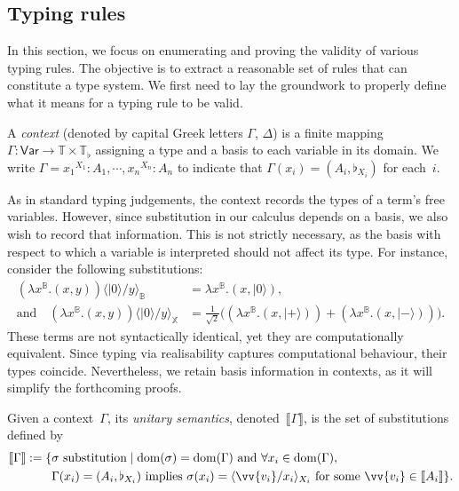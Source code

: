 \documentclass[runningheads,orivec,envcountsame,envcountsect]{llncs}
\newcommand\ket[1]{\ensuremath{|#1\rangle}}
\newcommand\Var{\ensuremath{\mathsf{Var}}}
\newcommand\ansubst[2]{\ensuremath{\langle #1 \rangle_{#2}}}
\newcommand\dom[1]{\mathrm{dom}(#1)}
\def\Pair#1#2{(#1,#2)} %
\def\Lam#1#2#3{\lambda#1^{#2}{.}#3} %
\def\Type{\mathbb{T}}
\def\BasisType{\Type_\flat}
\def\sem#1{\llbracket#1\rrbracket}
\newcommand\B{\mathbb B}
\newcommand\XB{\mathbb X}
\newcommand\basis[1]{\ensuremath{\flat_{#1}}}
\begin{document}
\subsection{Typing rules}    
In this section, we focus on enumerating and proving the validity of various
typing rules. The objective is to extract a reasonable set of rules that can
constitute a type system. We first need to lay the groundwork to properly define
what it means for a typing rule to be valid.

\begin{definition}
  A \emph{context} (denoted by capital Greek letters $\Gamma$, $\Delta$) is a
  finite mapping $\Gamma:\Var\to\Type\times\BasisType$ assigning a type and a
  basis to each variable in its domain. We write
  \(
    \Gamma = {x_1}^{{X_1}}:A_1,\dotsb, {x_n}^{{X_n}}:A_n
  \)
  to indicate that $\Gamma(x_i)=(A_i,\basis{X_i})$ for each~$i$.
\end{definition}

As in standard typing judgements, the context records the types of a term's
free variables. However, since substitution in our calculus depends on a basis,
we also wish to record that information. This is not strictly necessary, as the
basis with respect to which a variable is interpreted should not affect its
type. For instance, consider the following substitutions:
\begin{align*}
(\Lam{x}{\B}{\Pair{x}{y}})\ansubst{\ket{0}/y}{\B}
  &= \Lam{x}{\B}{\Pair{x}{\ket{0}}},\\
\text{and}\quad
(\Lam{x}{\B}{(x, y)})\ansubst{\ket{0}/y}{\XB}
  &= \tfrac{1}{\sqrt{2}}
    \bigl((\Lam{x}{\B}{\Pair{x}{\ket{+}}})
         + (\Lam{x}{\B}{\Pair{x}{\ket{-}}})\bigr).
\end{align*}
These terms are not syntactically identical, yet they are computationally
equivalent. 
Since typing via realisability captures computational behaviour,
their types coincide. Nevertheless, we retain basis information in contexts, as
it will simplify the forthcoming proofs.

\begin{definition}
  Given a context~$\Gamma$, its \emph{unitary semantics},
  denoted~$\sem{\Gamma}$, is the set of substitutions defined by
  \begin{align*}
    \sem{\Gamma}
    := 
    \{&\sigma~\text{substitution} \mid 
      \dom{\sigma} = \dom{\Gamma}
      \text{ and } \forall {x_i} \in \dom{\Gamma},\\
      &\Gamma(x_i) = (A_i, \basis{X_i})
      \text{ implies }
      \sigma(x_i) = \ansubst{\vv{v_i}/x_i}{{X_i}}
      \text{ for some }\vv{v_i} \in \sem{A_i}\}.
  \end{align*}
\end{definition}
\end{document}
